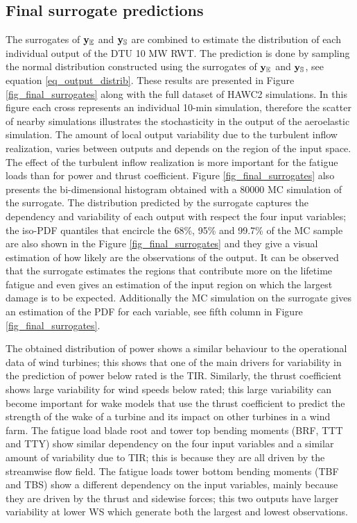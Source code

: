\documentclass[preprint,12pt]{elsarticle}
\begin{document}
\subsection{Final surrogate predictions}


The surrogates of $\mathbf{y}_{\mathbb{E}}$ and $\mathbf{y}_{\mathbb{S}}$ are combined to estimate the distribution of each individual output of the DTU 10 MW RWT. The prediction is done by sampling the normal distribution constructed using the surrogates of $\mathbf{y}_{\mathbb{E}}$ and $\mathbf{y}_{\mathbb{S}}$, see equation \ref{eq_output_distrib}. These results are presented in Figure \ref{fig_final_surrogates} along with the full dataset of HAWC2 simulations. In this figure each cross represents an individual 10-min simulation, therefore the scatter of nearby simulations illustrates the stochasticity in the output of the aeroelastic simulation. The amount of local output variability due to the turbulent inflow realization, varies between outputs and depends on the region of the input space. The effect of the turbulent inflow realization is more important for the fatigue loads than for power and thrust coefficient. Figure \ref{fig_final_surrogates} also presents the bi-dimensional histogram obtained with a 80000 MC simulation of the surrogate. The distribution predicted by the surrogate captures the dependency and variability of each output with respect the four input variables; the iso-PDF quantiles that encircle the 68\%, 95\% and 99.7\% of the MC sample are also shown in the Figure \ref{fig_final_surrogates} and they give a visual estimation of how likely are the observations of the output. It can be observed that the surrogate estimates the regions that contribute more on the lifetime fatigue and even gives an estimation of the input region on which the largest damage is to be expected. Additionally the MC simulation on the surrogate gives an estimation of the PDF for each variable, see fifth column in Figure \ref{fig_final_surrogates}. 

The obtained distribution of power shows a similar behaviour to the operational data of wind turbines; this shows that one of the main drivers for variability in the prediction of power below rated is the TIR. Similarly, the thrust coefficient shows large variability for wind speeds below rated; this large variability can become important for wake models that use the thrust coefficient to predict the strength of the wake of a turbine and its impact on other turbines in a wind farm. The fatigue load blade root and tower top bending moments (BRF, TTT and TTY) show similar dependency on the four input variables and a similar amount of variability due to TIR; this is because they are all driven by the streamwise flow field. The fatigue loads tower bottom bending moments (TBF and TBS) show a different dependency on the input variables, mainly because they are driven by the thrust and sidewise forces; this two outputs have larger variability at lower WS which generate both the largest and lowest observations.  
\end{document}
